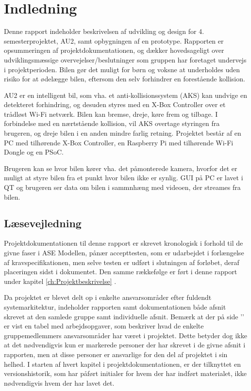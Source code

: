 \chapter{Indledning}
\label{ch:Indledning}

Denne rapport indeholder beskrivelsen af udvikling og design for 4. semesterprojektet, AU2, samt opbygningen af en prototype. 
Rapporten er opsummeringen af projektdokumentationen, og dækker hovedsageligt over udviklingsmæssige overvejelser/beslutninger som gruppen har foretaget undervejs i projektperioden. 
Bilen gør det muligt for børn og voksne at underholdes uden risiko for at ødelægge bilen, eftersom den selv forhindrer en forestående kollision.

AU2 er en intelligent bil, som vha. et anti-kollisionssystem (AKS) kan undvige en detekteret forhindring, og desuden styres med en X-Box Controller over et trådløst Wi-Fi netværk. Bilen kan bremse, dreje, køre frem og tilbage.
I forbindelse med en nærtstående kollision, vil AKS overtage styringen fra brugeren, og dreje bilen i en anden mindre farlig retning. 
Projektet består af en PC med tilhørende X-Box Controller, en Raspberry Pi med tilhørende Wi-Fi Dongle og en PSoC. 

Brugeren kan se hvor bilen kører vha. det påmonterede kamera, hvorfor det er muligt at styre bilen fra et punkt hvor bilen ikke er synlig.
GUI på PC er lavet i QT og brugeren ser data om bilen i sammnhæng med videoen, der streames fra bilen.

\section{Læsevejledning}
Projektdokumentationen til denne rapport er skrevet kronologisk i forhold til de givne faser i ASE Modellen\cite{lib:vejledning}, pånær accepttesten, som er udarbejdet i forlængelse af kravspecifikationen, men selve testen er udført i slutningen af forløbet, deraf placeringen sidst i dokumentet.
Den samme rækkefølge er ført i denne rapport under kapitel \ref{ch:Projektbeskrivelse} .

Da projektet er blevet delt op i enkelte ansvarsområder efter fuldendt systemarkitektur, indeholder rapporten samt dokumentationen både afsnit skrevet at den samlede gruppe samt individuelle afsnit.
Bemærk at der på side '\pageref{ch:arbejdsopgaver}' er vist en tabel med arbejdsopgaver, som beskriver hvad de enkelte gruppemedlemmers ansvarsområder har været i projektet. 
Dette betyder dog ikke at det nødvendigvis kun er markerede personer der har skrevet i de givne afsnit i rapporten, men at disse personer er ansvarlige for den del af projektet i sin helhed.
I starten af hvert kapitel i projektdokumentationen, er der tilknyttet en versionshistorik, som har påført initialer for hvem der har indført materialet, ikke nødvendigvis hvem der har lavet det.


